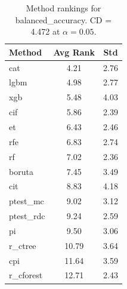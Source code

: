 \begin{table}[h]
\centering
\caption{Method rankings for balanced_accuracy. CD = 4.472 at $\alpha=0.05$.}
\label{tab:ranks_balanced_accuracy}
\begin{tabular}{lcc}
\toprule
Method & Avg Rank & Std \\
\midrule
cat & 4.21 & 2.76 \\
lgbm & 4.98 & 2.77 \\
xgb & 5.48 & 4.03 \\
cif & 5.86 & 2.39 \\
et & 6.43 & 2.46 \\
rfe & 6.83 & 2.74 \\
rf & 7.02 & 2.36 \\
boruta & 7.45 & 3.49 \\
cit & 8.83 & 4.18 \\
ptest_mc & 9.02 & 3.12 \\
ptest_rdc & 9.24 & 2.59 \\
pi & 9.50 & 3.06 \\
r_ctree & 10.79 & 3.64 \\
cpi & 11.64 & 3.59 \\
r_cforest & 12.71 & 2.43 \\
\bottomrule
\end{tabular}
\end{table}